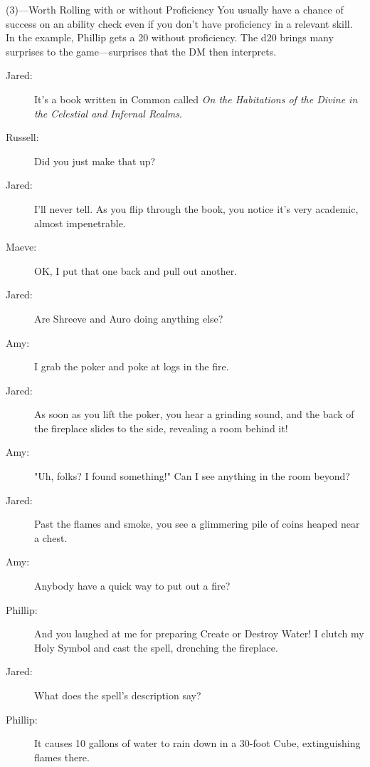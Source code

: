 \documentclass[10pt,a4paper,twoside,bg=print,twocolumn,openany,nodeprecatedcode]{dndbook}
\begin{document}
\begin{DndSidebar}[float=!b]{(3)—Worth Rolling with or without Proficiency}
You usually have a chance of success on an ability check even if you don't have proficiency in a relevant skill. In the example, Phillip gets a 20 without proficiency. The d20 brings many surprises to the game—surprises that the DM then interprets.



\end{DndSidebar}


\begin{description}
\item[Jared:]
It's a book written in Common called \textit{On the Habitations of the Divine in the Celestial and Infernal Realms}.
\item[Russell:]
Did you just make that up?
\item[Jared:]
I'll never tell. As you flip through the book, you notice it's very academic, almost impenetrable.
\item[Maeve:]
OK, I put that one back and pull out another.
\item[Jared:]
Are Shreeve and Auro doing anything else?
\end{description}

{\par \vspace { 9pt plus 3pt minus 3pt } \noindent  {} \nopagebreak }

\begin{description}
\item[Amy:]
I grab the poker and poke at logs in the fire.
\item[Jared:]
As soon as you lift the poker, you hear a grinding sound, and the back of the fireplace slides to the side, revealing a room behind it!
\end{description}


\begin{description}
\item[Amy:]
"Uh, folks? I found something!" Can I see anything in the room beyond?
\item[Jared:]
Past the flames and smoke, you see a glimmering pile of coins heaped near a chest.
\end{description}

{\par \vspace { 9pt plus 3pt minus 3pt } \noindent  {} \nopagebreak }

\begin{description}
\item[Amy:]
Anybody have a quick way to put out a fire?
\item[Phillip:]
And you laughed at me for preparing Create or Destroy Water! I clutch my Holy Symbol and cast the spell, drenching the fireplace.
\item[Jared:]
What does the spell's description say?
\item[Phillip:]
It causes 10 gallons of water to rain down in a 30-foot Cube, extinguishing flames there.
\end{description}
\end{document}
